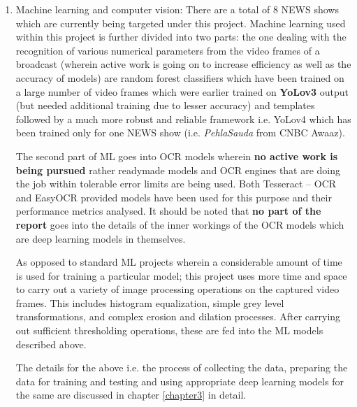 \begin{enumerate}
  \item Machine learning and computer vision: There are a total of 8 NEWS shows which are currently being targeted under this project. Machine learning used within this project is further divided into two parts: the one dealing with the recognition of various numerical parameters from the video frames of a broadcast (wherein active work is going on to increase efficiency as well as the accuracy of models) are random forest classifiers which have been trained on a large number of video frames which were earlier trained on \textbf{YoLov3} output (but needed additional training due to lesser accuracy) and templates followed by a much more robust and reliable framework i.e. YoLov4 which has been trained only for one NEWS show (i.e. \textit{PehlaSauda} from CNBC Awaaz). \par

  The second part of ML goes into OCR models wherein \textbf{no active work is being pursued} rather readymade models and OCR engines that are doing the job within tolerable error limits are being used. Both Tesseract – OCR and EasyOCR provided models have been used for this purpose and their performance metrics analysed. It should be noted that \textbf{no part of the report} goes into the details of the inner workings of the OCR models which are deep learning models in themselves. \par

  As opposed to standard ML projects wherein a considerable amount of time is used for training a particular model; this project uses more time and space to carry out a variety of image processing operations on the captured video frames. This includes histogram equalization, simple grey level transformations, and complex erosion and dilation processes. After carrying out sufficient thresholding operations, these are fed into the ML models described above. \par

  The details for the above i.e. the process of collecting the data, preparing the data for training and testing and using appropriate deep learning models for the same are discussed in chapter \ref{chapter3} in detail.


\end{enumerate}
